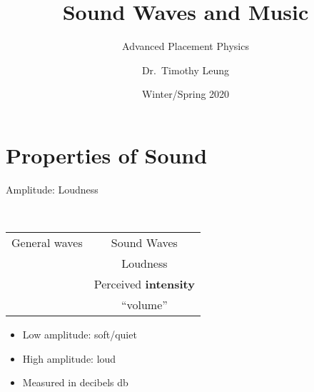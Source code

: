 \documentclass[12pt,compress,aspectratio=169]{beamer}
\title{Sound Waves and Music}
\subtitle{Advanced Placement Physics}
\author{Dr.\ Timothy Leung}
\institute{Olympiads School\\Toronto, Ontario, Canada}
\date{Winter/Spring 2020}
\begin{document}
\begin{frame}
  \titlepage
\end{frame}


\section[Properties]{Properties of Sound}

%



\begin{frame}{Amplitude: Loudness}
  \begin{center}
    \\

    \vspace{0.2in}
    \begin{tabular}{cc}
      \rowcolor{pink}
      General waves & Sound Waves \\
      \uncover<1->{\LARGE Amplitude} & {\LARGE Loudness} \\
      & {Perceived \textbf{intensity}} \\
      & {``volume''}
    \end{tabular}

    \begin{itemize}
    \item {\color{blue} Low amplitude}: soft/quiet
    \item {\color{red} High amplitude}: loud
    \item Measured in decibels \si{\decibel}
    \end{itemize}
  \end{center}
\end{frame}
\end{document}
